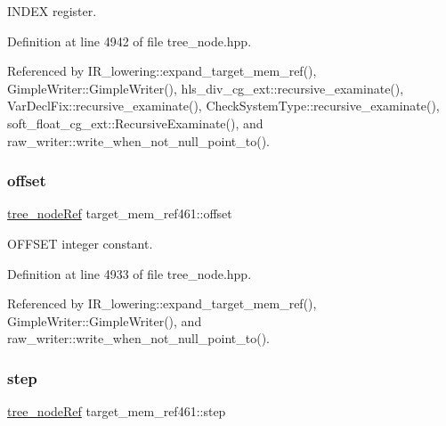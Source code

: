 I\+N\+D\+EX register. 



Definition at line 4942 of file tree\+\_\+node.\+hpp.



Referenced by I\+R\+\_\+lowering\+::expand\+\_\+target\+\_\+mem\+\_\+ref(), Gimple\+Writer\+::\+Gimple\+Writer(), hls\+\_\+div\+\_\+cg\+\_\+ext\+::recursive\+\_\+examinate(), Var\+Decl\+Fix\+::recursive\+\_\+examinate(), Check\+System\+Type\+::recursive\+\_\+examinate(), soft\+\_\+float\+\_\+cg\+\_\+ext\+::\+Recursive\+Examinate(), and raw\+\_\+writer\+::write\+\_\+when\+\_\+not\+\_\+null\+\_\+point\+\_\+to().

\mbox{\label{structtarget__mem__ref461_af959fd7e28c596e13f96da8cf709ab20}} 
\subsubsection{\texorpdfstring{offset}{offset}}
{\footnotesize\ttfamily \hyperlink{tree__node_8hpp_a6ee377554d1c4871ad66a337eaa67fd5}{tree\+\_\+node\+Ref} target\+\_\+mem\+\_\+ref461\+::offset}



O\+F\+F\+S\+ET integer constant. 



Definition at line 4933 of file tree\+\_\+node.\+hpp.



Referenced by I\+R\+\_\+lowering\+::expand\+\_\+target\+\_\+mem\+\_\+ref(), Gimple\+Writer\+::\+Gimple\+Writer(), and raw\+\_\+writer\+::write\+\_\+when\+\_\+not\+\_\+null\+\_\+point\+\_\+to().

\mbox{\label{structtarget__mem__ref461_ac2f08d6674df98a13e9c7969f3db90c4}} 
\subsubsection{\texorpdfstring{step}{step}}
{\footnotesize\ttfamily \hyperlink{tree__node_8hpp_a6ee377554d1c4871ad66a337eaa67fd5}{tree\+\_\+node\+Ref} target\+\_\+mem\+\_\+ref461\+::step}




